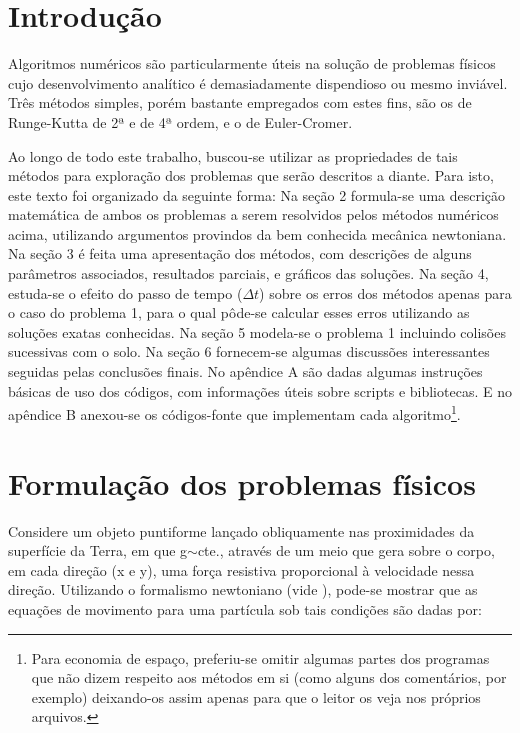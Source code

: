 \documentclass[a4paper, brazilian, 8pt, final]{article}
\begin{document}
\begin{multicols}{2}
\section{Introdução}
\quad Algoritmos numéricos são particularmente úteis na solução de problemas físicos cujo desenvolvimento analítico é demasiadamente dispendioso ou mesmo inviável. Três métodos simples, porém bastante empregados com estes fins, são os de Runge-Kutta de 2ª e de 4ª ordem, e o de Euler-Cromer. 

\quad Ao longo de todo este trabalho, buscou-se utilizar as propriedades de tais métodos para exploração dos problemas que serão descritos a diante. Para isto, este texto foi organizado da seguinte forma: Na seção 2 formula-se uma descrição matemática de ambos os problemas a serem resolvidos pelos métodos numéricos acima, utilizando argumentos provindos da bem conhecida mecânica newtoniana. Na seção 3 é feita uma apresentação dos métodos, com descrições de alguns parâmetros associados, resultados parciais, e gráficos das soluções. Na seção 4, estuda-se o efeito do passo de tempo ($\Delta t$) sobre os erros dos métodos apenas para o caso do problema 1, para o qual pôde-se calcular esses erros utilizando as soluções exatas conhecidas. Na seção 5 modela-se o problema 1 incluindo colisões sucessivas com o solo. Na seção 6 fornecem-se algumas discussões interessantes seguidas pelas conclusões finais. No apêndice A são dadas algumas instruções básicas de uso dos códigos, com informações úteis sobre scripts e bibliotecas. E no apêndice B anexou-se os códigos-fonte que implementam cada algoritmo\footnote{Para economia de espaço, preferiu-se omitir algumas partes dos programas que não dizem respeito aos métodos em si (como alguns dos comentários, por exemplo) deixando-os assim apenas para que o leitor os veja nos próprios arquivos.}.

\section{Formulação dos problemas físicos}
\quad Considere um objeto puntiforme lançado obliquamente nas proximidades da superfície da Terra, em que g$\sim$cte., através de um meio que gera sobre o corpo, em cada direção (x e y), uma força resistiva proporcional à velocidade nessa direção. Utilizando o formalismo newtoniano (vide \cite{Marion_book}), pode-se mostrar que as equações de movimento para uma partícula sob tais condições são dadas por:


\end{multicols}
\end{document}
